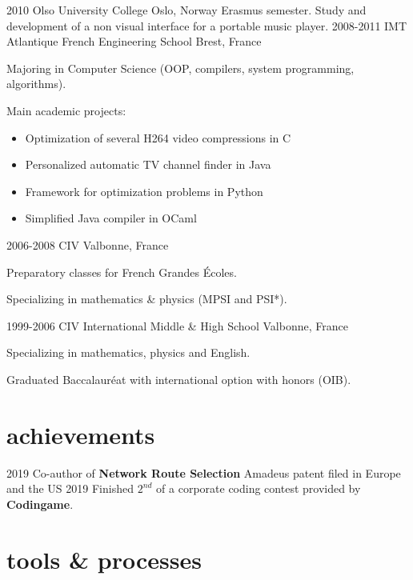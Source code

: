 \documentclass[]{twentysecondcv}
\begin{document}
\begin{twenty}
  \twentyitem
    {2010}
    {Olso University College}
    {Oslo, Norway}
    {Erasmus semester. Study and development of a non visual interface for a portable music player.}
  \twentyitem
    {2008-2011}
    {IMT Atlantique French Engineering School}
    {Brest, France}
    {Majoring in Computer Science (OOP, compilers, system programming, algorithms). 

Main academic projects:
\begin{itemize}
  \item Optimization of several H264 video compressions in C
  \item Personalized automatic TV channel finder in Java
  \item Framework for optimization problems in Python
  \item Simplified Java compiler in OCaml
\end{itemize}

}
  \twentyitem
    {2006-2008}
    {CIV}
    {Valbonne, France}
    {Preparatory classes for French Grandes Écoles.

Specializing in mathematics \& physics (MPSI and PSI*).}
  \twentyitem
    {1999-2006}
    {CIV International Middle \& High School}
    {Valbonne, France}
    {Specializing in mathematics, physics and English. 

Graduated Baccalauréat with international option with honors (OIB).}
\end{twenty}

\section{achievements}

\begin{twentyshort}
  \twentyitemshort
    {2019}
    {Co-author of \textbf{Network Route Selection} Amadeus patent filed in Europe and the US}
  \twentyitemshort
    {2019}
    {Finished $ 2^{nd}$ of a corporate coding contest provided by \textbf{Codingame}.}
\end{twentyshort}

\section{tools \& processes}



\end{document}
